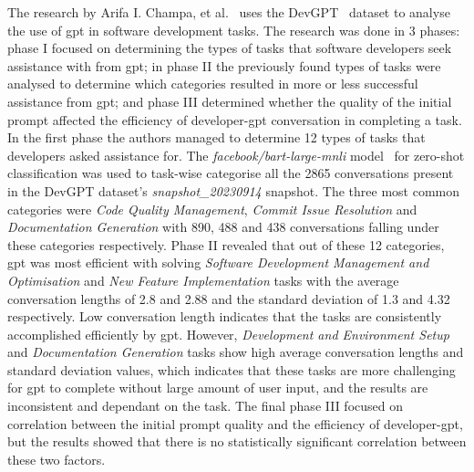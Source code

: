 The research by Arifa I. Champa, et al.~\cite{devgpt-use-analysis} uses the DevGPT~\cite{devgpt} dataset to analyse the use of \gls{gpt} in software development tasks. The research was done in 3 phases: phase I focused on determining the types of tasks that software developers seek assistance with from \gls{gpt}; in phase II the previously found types of tasks were analysed to determine which categories resulted in more or less successful assistance from \gls{gpt}; and phase III determined whether the quality of the initial prompt affected the efficiency of developer-\gls{gpt} conversation in completing a task. In the first phase the authors managed to determine 12 types of tasks that developers asked assistance for. The \textit{facebook/bart-large-mnli} model~\cite{bart-large-mnli} for zero-shot classification was used to task-wise categorise all the 2865 conversations present in the DevGPT dataset's \textit{snapshot\_20230914} snapshot. The three most common categories were \textit{Code Quality Management}, \textit{Commit Issue Resolution} and \textit{Documentation Generation} with 890, 488 and 438 conversations falling under these categories respectively. Phase II revealed that out of these 12 categories, \gls{gpt} was most efficient with solving \textit{Software Development Management and Optimisation} and \textit{New Feature Implementation} tasks with the average conversation lengths of 2.8 and 2.88 and the standard deviation of 1.3 and 4.32 respectively. Low conversation length indicates that the tasks are consistently accomplished efficiently by \gls{gpt}. However, \textit{Development and Environment Setup} and \textit{Documentation Generation} tasks show high average conversation lengths and standard deviation values, which indicates that these tasks are more challenging for \gls{gpt} to complete without large amount of user input, and the results are inconsistent and dependant on the task. The final phase III focused on correlation between the initial prompt quality and the efficiency of developer-\gls{gpt}, but the results showed that there is no statistically significant correlation between these two factors.

